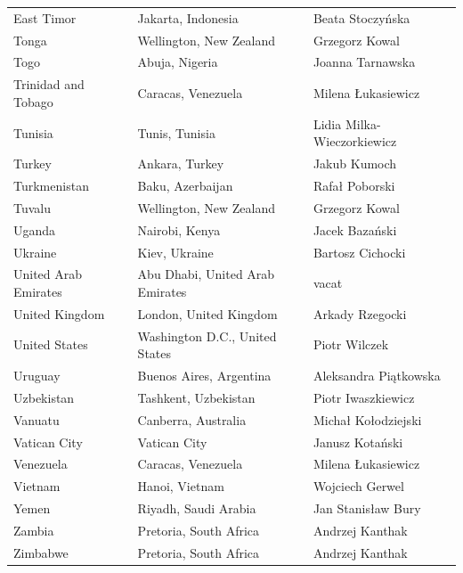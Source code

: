 \documentclass{article}
\begin{document}
\begin{tabular}{lll}
East Timor & Jakarta, Indonesia & Beata Stoczyńska \\
Tonga & Wellington, New Zealand & Grzegorz Kowal \\
Togo & Abuja, Nigeria & Joanna Tarnawska \\
Trinidad and Tobago & Caracas, Venezuela & Milena Łukasiewicz \\
Tunisia & Tunis, Tunisia & Lidia Milka-Wieczorkiewicz \\
Turkey & Ankara, Turkey & Jakub Kumoch \\
Turkmenistan & Baku, Azerbaijan & Rafał Poborski \\
Tuvalu & Wellington, New Zealand & Grzegorz Kowal \\
Uganda & Nairobi, Kenya & Jacek Bazański \\
Ukraine & Kiev, Ukraine & Bartosz Cichocki \\
United Arab Emirates & Abu Dhabi, United Arab Emirates & vacat \\
United Kingdom & London, United Kingdom & Arkady Rzegocki \\
United States & Washington D.C., United States & Piotr Wilczek \\
Uruguay & Buenos Aires, Argentina & Aleksandra Piątkowska \\
Uzbekistan & Tashkent, Uzbekistan & Piotr Iwaszkiewicz \\
Vanuatu & Canberra, Australia & Michał Kołodziejski \\
Vatican City & Vatican City & Janusz Kotański \\
Venezuela & Caracas, Venezuela & Milena Łukasiewicz \\
Vietnam & Hanoi, Vietnam & Wojciech Gerwel \\
Yemen & Riyadh, Saudi Arabia & Jan Stanisław Bury \\
Zambia & Pretoria, South Africa & Andrzej Kanthak \\
Zimbabwe & Pretoria, South Africa & Andrzej Kanthak \\
\bottomrule
\end{tabular}
\end{document}
